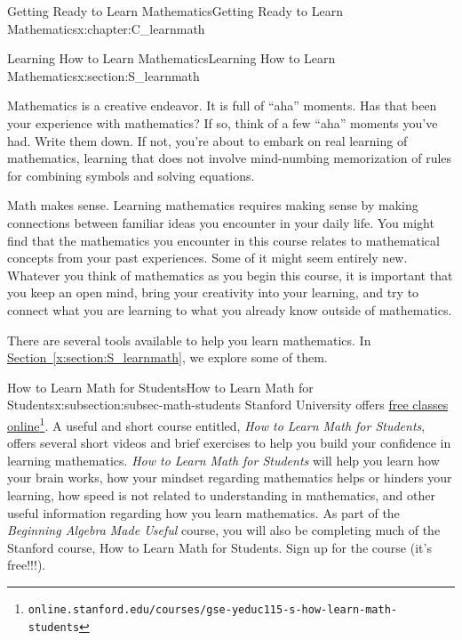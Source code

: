 \documentclass[oneside,10pt,]{book}
\newcommand{\xreffont}{\relax}
\newcommand{\pubtitle}[1]{\textsl{#1}}
\numberwithin{equation}{chapter}
\begin{document}
\begin{chapterptx}{Getting Ready to Learn Mathematics}{}{Getting Ready to Learn Mathematics}{}{}{x:chapter:C_learnmath}
%
%
\typeout{************************************************}
\typeout{************************************************}
%
\begin{sectionptx}{Learning How to Learn Mathematics}{}{Learning How to Learn Mathematics}{}{}{x:section:S_learnmath}
\begin{introduction}{}%
Mathematics is a creative endeavor. It is full of ``aha'' moments. Has that been your experience with mathematics? If so, think of a few ``aha'' moments you've had. Write them down. If not, you're about to embark on real learning of mathematics, learning that does not involve mind-numbing memorization of rules for combining symbols and solving equations.%
\par
Math makes sense. Learning mathematics requires making sense by making connections between familiar ideas you encounter in your daily life. You might find that the mathematics you encounter in this course relates to mathematical concepts from your past experiences. Some of it might seem entirely new. Whatever you think of mathematics as you begin this course, it is important that you keep an open mind, bring your creativity into your learning, and try to connect what you are learning to what you already know outside of mathematics.%
\par
There are several tools available to help you learn mathematics. In \hyperref[x:section:S_learnmath]{Section~{\xreffont\ref{x:section:S_learnmath}}}, we explore some of them.%
\end{introduction}%
%
%
\typeout{************************************************}
\typeout{************************************************}
%
\begin{subsectionptx}{How to Learn Math for Students}{}{How to Learn Math for Students}{}{}{x:subsection:subsec-math-students}
Stanford University offers \href{https://online.stanford.edu/courses/gse-yeduc115-s-how-learn-math-students}{free classes online}\footnote{\nolinkurl{online.stanford.edu/courses/gse-yeduc115-s-how-learn-math-students}\label{g:fn:idp1871403128}}. A useful and short course entitled, \pubtitle{How to Learn Math for Students}, offers several short videos and brief exercises to help you build your confidence in learning mathematics. \pubtitle{How to Learn Math for Students} will help you learn how your brain works, how your mindset regarding mathematics helps or hinders your learning, how speed is not related to understanding in mathematics, and other useful information regarding how you learn mathematics. As part of the \pubtitle{Beginning Algebra Made Useful} course, you will also be completing much of the Stanford course, How to Learn Math for Students. Sign up for the course (it's free!!!).%

\end{subsectionptx}
\end{sectionptx}
\end{chapterptx}
\end{document}
